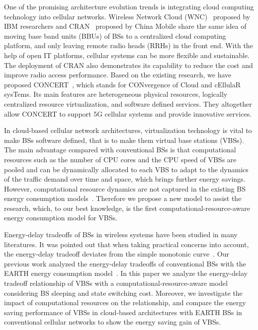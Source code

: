 \documentclass[conference]{IEEEtran}
\begin{document}
One of the promising architecture evolution trends is integrating cloud computing technology into
cellular networks. Wireless Network Cloud (WNC)~\cite{lin2010wireless} proposed
by IBM researchers and CRAN~\cite{cmri2013cran} proposed by China Mobile share
the same idea of moving base band units (BBUs) of BSs to
a centralized cloud computing platform, and only leaving remote radio heads
(RRHs) in the front end. With the help of open IT platforms,
cellular systems can be more flexible and sustainable. The deployment of CRAN
also demonstrates its capability to reduce the cost and improve radio access
performance.  Based on the existing research, we have proposed
CONCERT~\cite{liu2014concert}, which stands for CONvergence of Cloud and
cEllulaR sysTems. Its main features are heterogeneous physical resources,
logically centralized resource virtualization, and software defined services.
They altogether allow CONCERT to support
5G cellular systems and provide innovative services.

In cloud-based cellular network architectures, virtualization technology
is vital to make BSs software defined, that is to make them virtual base stations (VBSs). The
main advantage compared with conventional BSs is that computational resources
such as the number of CPU cores and the CPU speed
of VBSs are pooled and can be dynamically allocated to each VBS to adapt to
the dynamics of the traffic demand over time and space, which brings
further energy savings. However, computational resource dynamics are
not captured in the existing BS energy consumption
models~\cite{auer2011howmuch,gupta2012energy}. Therefore we propose a new
model to assist the research, which, to our best knowledge, is the first
computational-resource-aware energy consumption model for VBSs.

Energy-delay tradeoffs of BSs in wireless systems have been
studied in many literatures. It was pointed out that when taking practical
concerns into account, the energy-delay tradeoff deviates from the simple
monotonic curve~\cite{chen2011fundamental}.  Our previous work analyzed the
energy-delay tradeoffs of conventional BSs with the EARTH energy consumption
model~\cite{wu2012traffic,wu2013traffic}.  In this paper we analyze the
energy-delay tradeoff relationship of VBSs with a computational-resource-aware
model considering BS sleeping and state switching cost.
Moreover, we investigate the impact of computational resources on the
relationship, and compare
the energy saving performance of VBSs in cloud-based architectures with
EARTH BSs in conventional cellular networks to show the
energy saving gain of VBSs.
\end{document}
